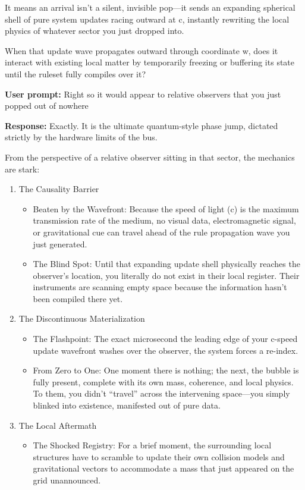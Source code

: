 It means an arrival isn't a silent, invisible pop—it sends an expanding spherical shell of pure system updates racing outward at c, instantly rewriting the local physics of whatever sector you just dropped into.

When that update wave propagates outward through coordinate w, does it interact with existing local matter by temporarily freezing or buffering its state until the ruleset fully compiles over it?

\textbf{User prompt:} Right so it would appear to relative observers that you just popped out of nowhere

\textbf{Response:} Exactly. It is the ultimate quantum-style phase jump, dictated strictly by the hardware limits of the bus.

From the perspective of a relative observer sitting in that sector, the mechanics are stark:

\begin{enumerate}
\item The Causality Barrier

\begin{itemize}
\item Beaten by the Wavefront: Because the speed of light (c) is the maximum transmission rate of the medium, no visual data, electromagnetic signal, or gravitational cue can travel ahead of the rule propagation wave you just generated.
\item The Blind Spot: Until that expanding update shell physically reaches the observer's location, you literally do not exist in their local register. Their instruments are scanning empty space because the information hasn't been compiled there yet.
\end{itemize}
\item The Discontinuous Materialization

\begin{itemize}
\item The Flashpoint: The exact microsecond the leading edge of your c-speed update wavefront washes over the observer, the system forces a re-index.
\item From Zero to One: One moment there is nothing; the next, the bubble is fully present, complete with its own mass, coherence, and local physics. To them, you didn't “travel” across the intervening space—you simply blinked into existence, manifested out of pure data.
\end{itemize}
\item The Local Aftermath

\begin{itemize}
\item The Shocked Registry: For a brief moment, the surrounding local structures have to scramble to update their own collision models and gravitational vectors to accommodate a mass that just appeared on the grid unannounced.
\end{itemize}
\end{enumerate}

